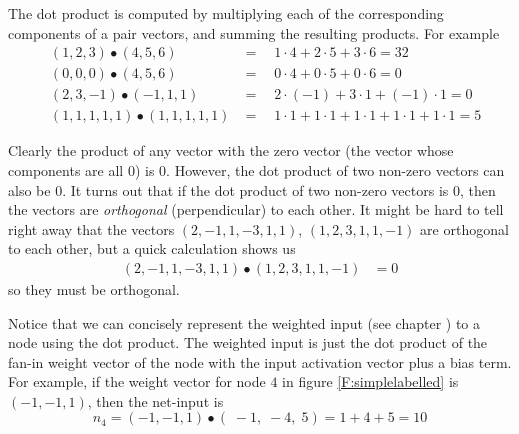    The dot product is computed by multiplying each of the corresponding 
components of a pair vectors, and summing the resulting products. For example
\begin{eqnarray*}
&(1,2,3)  \bullet  (4,5,6)& = \quad 1 \cdot 4 + 2 \cdot 5 + 3 \cdot 6 = 32   \\
&(0,0,0)  \bullet  (4,5,6)& = \quad 0 \cdot 4 + 0 \cdot 5 + 0 \cdot 6 = 0    \\
&(2,3,-1) \bullet (-1,1,1)& = \quad 2 \cdot (-1) + 3 \cdot 1 + (-1) \cdot 1 = 0 \\
 &(1,1,1,1,1) \bullet (1,1,1,1,1)& = \quad  
          1 \cdot 1 + 1 \cdot 1 +  1 \cdot 1 + 1 \cdot 1 + 1 \cdot 1 = 5
\end{eqnarray*}

   Clearly the product of any vector with the zero vector (the vector whose
components are all $0$) is $0$. However, the dot product of two non-zero 
vectors can also be $0$. It turns out that if the dot product of two non-zero 
vectors is $0$, then the vectors are {\em orthogonal} (perpendicular) to each 
other. It might be hard to tell right away that the vectors 
$(2,-1,1,-3,1,1)$, $(1,2,3,1,1,-1)$ are orthogonal to each other, but a quick calculation 
shows us
\begin{eqnarray*}
 (2,-1,1,-3,1,1) \bullet (1,2,3,1,1,-1)& = 0
\end{eqnarray*}
so they must be orthogonal. 

 Notice that we can concisely represent the weighted input (see chapter )
to a node using the dot product. The weighted input is just the dot product of
the fan-in weight vector of the node with the input activation vector plus a
bias term. For example, if the weight vector for node $4$ in figure \ref{F:simplelabelled} is 
$(-1,-1,1)$, then the net-input is
\begin{equation*}
n_4 = (-1,-1,1) \bullet (\; -1,\; -4,\; 5) = 1 + 4 +5 = 10
\end{equation*}



